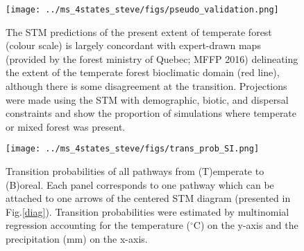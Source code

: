 \clearpage

\begin{figure}[p]
  \begin{center}
    \texttt{[image: ../ms\_4states\_steve/figs/pseudo\_validation.png]}
    \caption[The STM predictions of the present extent of temperate forest and the expert-drawn maps (provided by the forest ministry of Quebec; MFFP 2016) delineating the extent of the temperate forest bioclimatic domain]{The STM predictions of the present extent of temperate forest (colour scale) is largely concordant with expert-drawn maps (provided by the forest ministry of Quebec; MFFP 2016) delineating the extent of the temperate forest bioclimatic domain (red line), although there is some disagreement at the transition.
	Projections were made using the STM with demographic, biotic, and dispersal constraints and show the proportion of simulations where temperate or mixed forest was present.}
    \label{validation_fig}
  \end{center}
\end{figure}

\clearpage

\begin{figure}[p]
  \begin{center}
    \texttt{[image: ../ms\_4states\_steve/figs/trans\_prob\_SI.png]}
    \caption[Transition probabilities of all pathways from (T)emperate to (B)oreal]{Transition probabilities of all pathways from (T)emperate to (B)oreal. Each panel corresponds to one pathway which can be attached to one arrows of the centered STM diagram (presented in Fig.\ref{diag}). Transition probabilities were estimated by multinomial regression accounting for the temperature ($^{\circ}$C) on the y-axis and the precipitation (mm) on the x-axis.}
    \label{nnet_space_TotB}
  \end{center}
\end{figure}

\cleardoublepage
